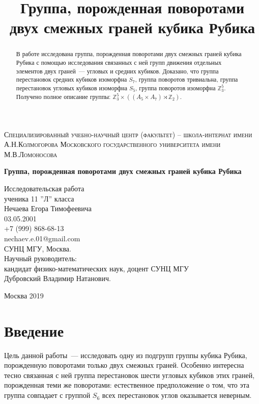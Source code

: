 \documentclass[utf8,a4paper,12pt]{article}
\title{Группа, порожденная поворотами двух смежных граней кубика Рубика}
\author{}
\date{}
\begin{document}
\begin{center}
{\scshape Специализированный учебно-научный центр (факультет) – школа-интернат имени А.Н.Колмогорова Московского государственного университета имени М.В.Ломоносова\par}
\par\vfill
\vspace{1.5cm}
{\Large\bfseries
Группа, порожденная поворотами двух смежных граней кубика Рубика
\par}
\vspace{1.5cm}
\par\vfill
\noindent\hspace{0.52\textwidth}\parbox[t]{0.48\textwidth}{
Исследовательская работа\\[3pt]
ученика 11 ''Л'' класса\\[3pt]
Нечаева Егора Тимофеевича\\[3pt]
03.05.2001\\[3pt]
+7 (999) 868-68-13\\[3pt]
nechaev.e.01@gmail.com\\[3pt]
СУНЦ МГУ, Москва.\\[3pt]
Научный руководитель:\\[3pt]
кандидат физико-математических наук, доцент СУНЦ МГУ\\
Дубровский Владимир Натанович.\\[2ex]
}
\par\vfill
Москва 2019
\end{center}
\thispagestyle{empty}
\pagebreak

\begin{abstract}
В работе исследована группа, порожденная поворотами двух смежных граней кубика Рубика с помощью исследования связанных с ней групп движения отдельных элементов двух граней~--- угловых и средних кубиков. Доказано, что группа перестановок средних кубиков изоморфна $S_7$, группа поворотов тривиальна, группа перестановок угловых кубиков изоморфна $S_5$, группа поворотов изоморфна $\mathbb{Z}_3^5$. Получено полное описание группы: $\mathbb{Z}_3^5\times ((A_5\times A_7)\rtimes\mathbb{Z}_2)$.
\end{abstract}
\section{Введение}
Цель данной работы~--- исследовать одну из подгрупп группы кубика Рубика, порожденную поворотами только двух смежных граней. Особенно интересна тесно связанная с ней группа перестановок шести угловых кубиков этих граней, порожденная теми же поворотами: естественное предположение о том, что эта группа совпадает с группой $S_6$ всех перестановок углов оказывается неверным.
\end{document}
